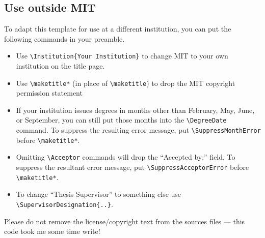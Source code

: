 \documentclass[11pt]{article}
\begin{document}
\subsection{Use outside MIT}
To adapt this template for use at a different institution, you can put the following commands in your preamble.  
\begin{itemize}
\item Use \verb|\Institution{Your Institution}| to change MIT to your own institution on the title page.

\item Use \verb|\maketitle*| (in place of \verb|\maketitle|) to drop the MIT copyright permission statement

\item If your institution issues degrees in months other than February, May, June, or September, you can still put those months into the 
\verb|\DegreeDate| command. To suppress the resulting error message, put \verb|\SuppressMonthError| before \verb|\maketitle*|. 

\item Omitting \verb|\Acceptor| commands will drop the ``Accepted by:'' field. To suppress the resultant error message, put \verb|\SuppressAcceptorError| before \verb|\maketitle*|.

\item To change ``Thesis Supervisor'' to something else use \verb|\SupervisorDesignation{..}|.
\end{itemize}
Please do not remove the license/copyright text from the sources files --- this code took me some time write!
\end{document}
